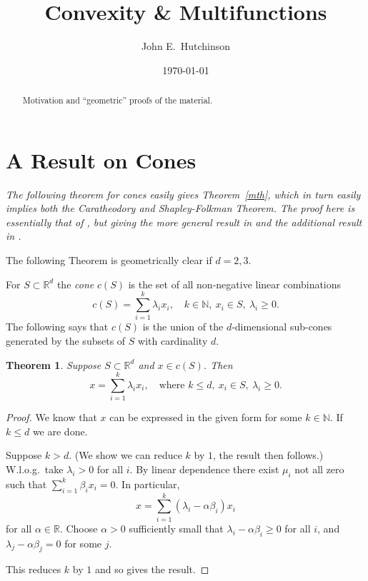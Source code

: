 \documentclass[a4paper]{amsart}
\theoremstyle{plain}
\newtheorem{theorem}{Theorem}[section]
\theoremstyle{definition}
\theoremstyle{remark}
\begin{document}
\title{Convexity \& Multifunctions}  
\author{John E.\ Hutchinson}
\date{\today}

 

\maketitle

\tableofcontents



\begin{abstract}  Motivation and ``geometric'' proofs of the material.  
\end{abstract}
\section{\textbf{A Result on Cones}}  
\noindent \emph{The following theorem for cones easily gives Theorem~\ref{mth}, which in turn easily implies both the Caratheodory and Shapley-Folkman Theorem.   The proof here is essentially that of \cite{Zho}, but giving the more general result in 
\cite{And} and the additional result in \cite{Sta}.}   




\bigskip The following Theorem is  geometrically clear if $d=2,3 $. 

For $  S \subset \mathbb{R}^d  $ the \emph{cone} $ c(S) $ is the set of all non-negative linear combinations
 \[
  c(S) = \sum_{i=1}^k \lambda_i x_i ,\quad  k \in \mathbb{N},\  x_i \in S, \  \lambda_i \geq 0   .
  \] 
The following says that $ c(S) $  is the union of the $ d $-dimensional sub-cones generated by  the subsets of $ S $ with cardinality $ d $.
 
\begin{theorem}\label{prco}
Suppose   $  S \subset \mathbb{R}^d  $ and $ x \in c(S) $.  Then 
\[
 x = \sum_{i=1}^k \lambda_i x_i ,\quad  \text{where } k\leq d,\  x_i \in S, \  \lambda_i \geq 0   .
 \]
\end{theorem} 


\begin{proof} We know that $ x $ can be expressed in the given form  for some $ k\in \mathbb{N}  $.  If $ k \leq  d $ we are done. 

Suppose  $ k > d $.  (We show we can reduce $ k $ by $ 1 $, the result then follows.)
W.l.o.g.\ take $ \lambda_i > 0 $ for all $ i $.
By linear dependence  there exist $ \mu_i $ not all zero such that 
$ \sum_{i=1}^k \beta _i x_i = 0 $. In particular,
\[
x =  \sum_{i=1}^{ k } (\lambda_i- \alpha \beta _i)  x_i
\]
for all $ \alpha \in \mathbb{R} $.  Choose $ \alpha >0 $ sufficiently small that $ \lambda_i- \alpha \beta _i \geq 0 $ for all $ i $, and 
 $ \lambda_j- \alpha \beta _j = 0 $ for some $ j $.

This reduces $ k $ by $ 1 $ and so gives the result.
\end{proof} 
\end{document}
